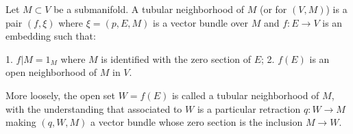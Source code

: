 Let $M \subset V$ be a submanifold. A tubular neighborhood of $M$ (or for $(V,M)$) is a pair $(f,\xi)$ where $\xi = (p,E,M)$ is a vector bundle over $M$ and $f: E \rightarrow V$ is an embedding such that:

1. $f|M = 1_M$ where $M$ is identified with the zero section of $E$;
2. $f(E)$ is an open neighborhood of $M$ in $V$.

More loosely, the open set $W = f(E)$ is called a tubular neighborhood of $M$, with the understanding that associated to $W$ is a particular retraction $q: W \rightarrow M$ making $(q,W,M)$ a vector bundle whose zero section is the inclusion $M \rightarrow W$.

